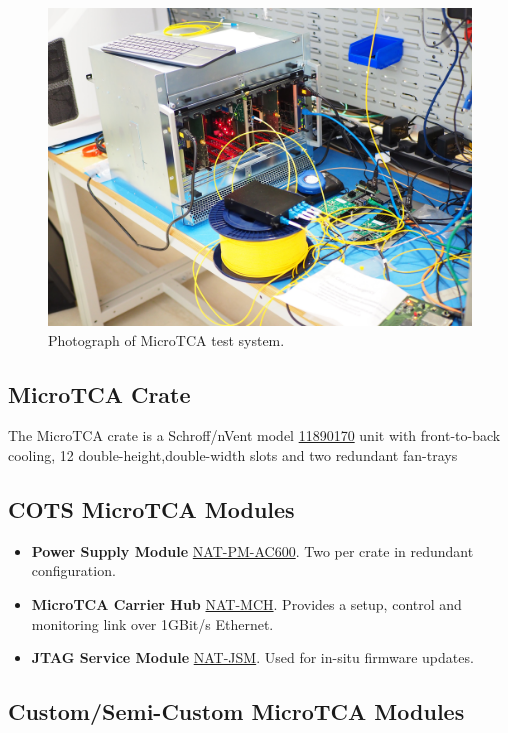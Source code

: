\documentclass[fleqn,12pt,a4paper]{olplainarticle}
\begin{document}
\begin{figure}
  \centering
  \includegraphics[width=0.8\linewidth]{P7150030.JPG}
  \caption{Photograph of MicroTCA test system.}
  \label{fig:dts-utca-test-system-photo}
\end{figure}


\subsection{MicroTCA Crate}

The MicroTCA crate is a Schroff/nVent model \href{https://schroff.nvent.com/en-gb/products/enc11890-170}{11890170} unit with front-to-back cooling, 12 double-height,double-width slots and two redundant fan-trays 

\subsection{COTS MicroTCA Modules}

\begin{itemize}
    \item {\bf Power Supply Module}   \href{https://nateurope.com/product/nat-pm-ac600-600w-ac-power-module-mtca0/}{NAT-PM-AC600}. Two per crate in redundant configuration.
    \item {\bf MicroTCA Carrier Hub} \href{https://nateurope.com/product/nat-mch/}{NAT-MCH}. Provides a setup, control and monitoring link over 1GBit/s Ethernet.
    \item {\bf JTAG Service Module} \href{https://nateurope.com/product/nat-jsm/}{NAT-JSM}. Used for in-situ firmware updates.
\end{itemize}

\subsection{Custom/Semi-Custom MicroTCA Modules}
\end{document}

